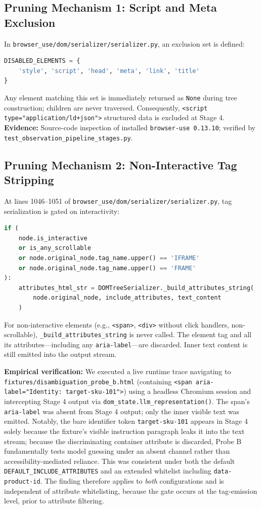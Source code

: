 \documentclass[conference]{IEEEtran}
\begin{document}
\subsection{Pruning Mechanism 1: Script and Meta Exclusion}

In \texttt{browser\_use/dom/serializer/serializer.py}, an exclusion set is defined:
\begin{lstlisting}[language=Python]
DISABLED_ELEMENTS = {
    'style', 'script', 'head', 'meta', 'link', 'title'
}
\end{lstlisting}
Any element matching this set is immediately returned as \texttt{None} during tree construction; children are never traversed. Consequently, \texttt{<script type="application/ld+json">} structured data is excluded at Stage 4. \textbf{Evidence:} Source-code inspection of installed \texttt{browser-use 0.13.10}; verified by \texttt{test\_observation\_pipeline\_stages.py}.

\subsection{Pruning Mechanism 2: Non-Interactive Tag Stripping}

At lines 1046--1051 of \texttt{browser\_use/dom/serializer/serializer.py}, tag serialization is gated on interactivity:
\begin{lstlisting}[language=Python]
if (
    node.is_interactive
    or is_any_scrollable
    or node.original_node.tag_name.upper() == 'IFRAME'
    or node.original_node.tag_name.upper() == 'FRAME'
):
    attributes_html_str = DOMTreeSerializer._build_attributes_string(
        node.original_node, include_attributes, text_content
    )
\end{lstlisting}
For non-interactive elements (e.g., \texttt{<span>}, \texttt{<div>} without click handlers, non-scrollable), \texttt{\_build\_attributes\_string} is never called. The element tag and all its attributes---including any \texttt{aria-label}---are discarded. Inner text content is still emitted into the output stream.

\textbf{Empirical verification:} We executed a live runtime trace navigating to \texttt{fixtures/disambiguation\_probe\_b.html} (containing \texttt{<span aria-label="Identity: target-sku-101">}) using a headless Chromium session and intercepting Stage 4 output via \texttt{dom\_state.llm\_representation()}. The span's \texttt{aria-label} was absent from Stage 4 output; only the inner visible text was emitted. Notably, the bare identifier token \texttt{target-sku-101} appears in Stage 4 solely because the fixture's visible instruction paragraph leaks it into the text stream; because the discriminating container attribute is discarded, Probe B fundamentally tests model guessing under an absent channel rather than accessibility-mediated reliance. This was consistent under both the default \texttt{DEFAULT\_INCLUDE\_ATTRIBUTES} and an extended whitelist including \texttt{data-product-id}. The finding therefore applies to \emph{both} configurations and is independent of attribute whitelisting, because the gate occurs at the tag-emission level, prior to attribute filtering.
\end{document}
